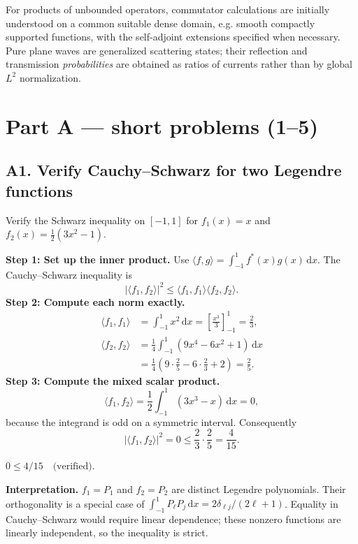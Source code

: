 \documentclass[11pt,a4paper]{article}
\newcommand{\key}[1]{\begin{resultbox}\centering\(\displaystyle #1\)\end{resultbox}}
\newcommand{\dd}{\mathrm{d}}
\newcommand{\abs}[1]{\left|#1\right|}
\begin{document}
For products of unbounded operators, commutator calculations are initially understood on a common suitable dense domain, e.g. smooth compactly supported functions, with the self-adjoint extensions specified when necessary. Pure plane waves are generalized scattering states; their reflection and transmission \emph{probabilities} are obtained as ratios of currents rather than by global $L^2$ normalization.

\section{Part A --- short problems (1--5)}
\subsection{A1. Verify Cauchy--Schwarz for two Legendre functions}
\begin{questionbox}
Verify the Schwarz inequality on $[-1,1]$ for $f_1(x)=x$ and $f_2(x)=\tfrac12(3x^2-1)$.
\end{questionbox}
\textbf{Step 1: Set up the inner product.} Use $\langle f,g\rangle=\int_{-1}^{1}f^*(x)g(x)\,\dd x$. The Cauchy--Schwarz inequality is
\begin{equation}\abs{\langle f_1,f_2\rangle}^2\leq\langle f_1,f_1\rangle\langle f_2,f_2\rangle.
\end{equation}
\textbf{Step 2: Compute each norm exactly.}
\begin{align}
\langle f_1,f_1\rangle&=\int_{-1}^{1}x^2\,\dd x=\left[\frac{x^3}{3}\right]_{-1}^{1}=\frac23,\\
\langle f_2,f_2\rangle&=\frac14\int_{-1}^{1}(9x^4-6x^2+1)\,\dd x\nonumber\\
&=\frac14\left(9\cdot\frac25-6\cdot\frac23+2\right)=\frac25.
\end{align}
\textbf{Step 3: Compute the mixed scalar product.}
\begin{equation}
\langle f_1,f_2\rangle=\frac12\int_{-1}^{1}(3x^3-x)\,\dd x=0,
\end{equation}
because the integrand is odd on a symmetric interval. Consequently
\begin{equation}
\abs{\langle f_1,f_2\rangle}^2=0\leq \frac23\cdot\frac25=\frac4{15}.
\end{equation}
\key{\boxed{0\leq 4/15\quad\text{(verified).}}}
\textbf{Interpretation.} $f_1=P_1$ and $f_2=P_2$ are distinct Legendre polynomials. Their orthogonality is a special case of $\int_{-1}^{1}P_\ell P_j\,\dd x=2\delta_{\ell j}/(2\ell+1)$. Equality in Cauchy--Schwarz would require linear dependence; these nonzero functions are linearly independent, so the inequality is strict.
\end{document}
